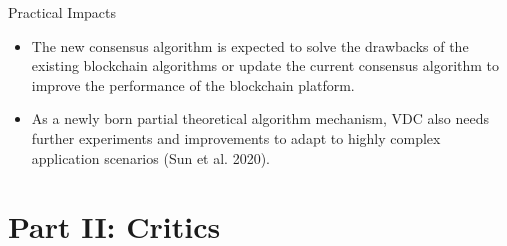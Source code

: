 \documentclass{beamer}
\begin{document}
	\begin{frame}{Practical Impacts}
			    \begin{itemize} 
			    \item  The new consensus algorithm is expected to solve the drawbacks of the existing blockchain algorithms or update the current consensus algorithm to improve the performance of the blockchain platform. 
			    \item As a newly born partial theoretical algorithm mechanism, VDC also needs further experiments and improvements to adapt to highly complex application scenarios (Sun et al. 2020).
			    \end{itemize}
		    \end{frame}
	
	
	
	
	
	
	
	
	
	
	
	\section{Part II: Critics}
			   
\end{document}
